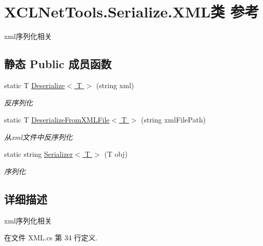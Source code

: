 \hypertarget{class_x_c_l_net_tools_1_1_serialize_1_1_x_m_l}{\section{X\-C\-L\-Net\-Tools.\-Serialize.\-X\-M\-L类 参考}
\label{class_x_c_l_net_tools_1_1_serialize_1_1_x_m_l}
}


xml序列化相关  


\subsection*{静态 Public 成员函数}
\begin{DoxyCompactItemize}
\item 
static T \hyperlink{class_x_c_l_net_tools_1_1_serialize_1_1_x_m_l_a10f494104b432660b2cbfbd686425ff9}{Deserialize$<$ T $>$} (string xml)
\begin{DoxyCompactList}\small\item\em 反序列化 \end{DoxyCompactList}\item 
static T \hyperlink{class_x_c_l_net_tools_1_1_serialize_1_1_x_m_l_afdebd810bc96d095cab8ccdf8aaca684}{Deserialize\-From\-X\-M\-L\-File$<$ T $>$} (string xml\-File\-Path)
\begin{DoxyCompactList}\small\item\em 从xml文件中反序列化 \end{DoxyCompactList}\item 
static string \hyperlink{class_x_c_l_net_tools_1_1_serialize_1_1_x_m_l_a9540436b849eff236f8353cad8b20658}{Serializer$<$ T $>$} (T obj)
\begin{DoxyCompactList}\small\item\em 序列化 \end{DoxyCompactList}\end{DoxyCompactItemize}


\subsection{详细描述}
xml序列化相关 



在文件 X\-M\-L.\-cs 第 34 行定义.



